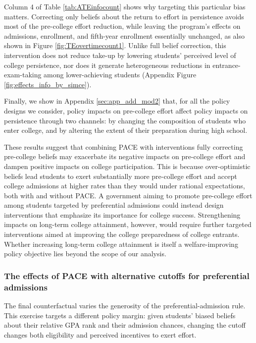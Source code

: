 Column 4 of Table \ref{tab:ATEinfocount} shows why targeting this particular bias matters. Correcting only beliefs about the return to effort in persistence avoids most of the pre-college effort reduction, while leaving the program's effects on admissions, enrollment, and fifth-year enrollment essentially unchanged, as also shown in Figure \ref{fig:TEovertimecount1}. Unlike full belief correction, this intervention does not reduce take-up by lowering students' perceived level of college persistence, nor does it generate heterogeneous reductions in entrance-exam-taking among lower-achieving students (Appendix Figure \ref{fig:effects_info_by_simce}). \par




Finally, we show in Appendix \ref{sec:app_add_mod2} that, for all the policy designs we consider, policy impacts on pre-college effort affect policy impacts on persistence through two channels: by changing the composition of students who enter college, and by altering the extent of their preparation during high school.\par 






These results suggest that combining PACE with interventions fully correcting pre-college beliefs may exacerbate its negative impacts on pre-college effort and dampen positive impacts on college participation. This is because over-optimistic beliefs lead students to exert substantially more pre-college effort and accept college admissions at higher rates than they would under rational expectations, both with and without PACE. A government aiming to promote pre-college effort among students targeted by preferential admissions could instead design interventions that emphasize its importance for college success. Strengthening impacts on long-term college attainment, however, would require further targeted interventions aimed at improving the college preparedness of college entrants. Whether increasing long-term college attainment is itself a welfare-improving policy objective lies beyond the scope of our analysis.\par 






\subsubsection{The effects of PACE with alternative cutoffs for preferential admissions}\label{sec:mcutoffs}
The final counterfactual varies the generosity of the preferential-admission rule. This exercise targets a different policy margin: given students' biased beliefs about their relative GPA rank and their admission chances, changing the cutoff changes both eligibility and perceived incentives to exert effort.

